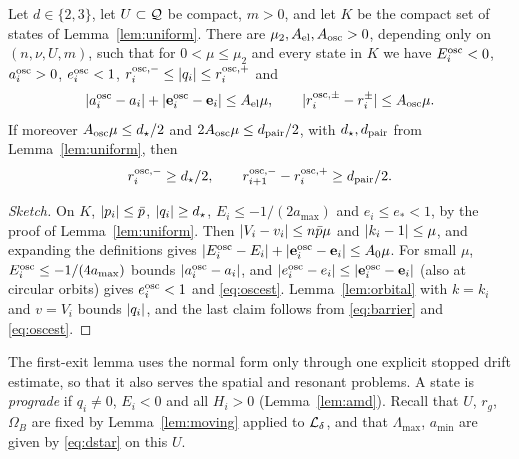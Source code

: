 \begin{lemma}
\label{lem:osc}
Let $d\in\{2,3\}$, let $U\subset\mathcal{Q}$ be compact, $m>0$, and let $K$ be the compact set of states of Lemma~\ref{lem:uniform}. There are $\mu_2,A_{\mathrm{el}},A_{\mathrm{osc}}>0$, depending only on $(n,\nu,U,m)$, such that for $0<\mu\le\mu_2$ and every state in $K$ we have $E_i^{\mathrm{osc}}<0$, $a_i^{\mathrm{osc}}>0$, $e_i^{\mathrm{osc}}<1$, $r_i^{\mathrm{osc},-}\le\lvert q_i\rvert\le r_i^{\mathrm{osc},+}$ and
\begin{equation}
\label{eq:oscest}
\lvert a_i^{\mathrm{osc}}-a_i\rvert+\lvert \mathbf{e}_i^{\mathrm{osc}}-\mathbf{e}_i\rvert\le A_{\mathrm{el}}\mu,\qquad \lvert r_i^{\mathrm{osc},\pm}-r_i^\pm\rvert\le A_{\mathrm{osc}}\mu.
\end{equation}
If moreover $A_{\mathrm{osc}}\mu\le d_\star/2$ and $2A_{\mathrm{osc}}\mu\le d_{\mathrm{pair}}/2$, with $d_\star,d_{\mathrm{pair}}$ from Lemma~\ref{lem:uniform}, then
\[
r_i^{\mathrm{osc},-}\ge d_\star/2,\qquad r_{i+1}^{\mathrm{osc},-}-r_i^{\mathrm{osc},+}\ge d_{\mathrm{pair}}/2.
\]
\end{lemma}

\begin{proof}[Sketch]
On $K$, $\lvert p_i\rvert\le\bar p$, $\lvert q_i\rvert\ge d_\star$, $E_i\le-1/(2a_{\max})$ and $e_i\le e_*<1$, by the proof of Lemma~\ref{lem:uniform}. Then $\lvert V_i-v_i\rvert\le n\bar p\mu$ and $\lvert k_i-1\rvert\le\mu$, and expanding the definitions gives $\lvert E_i^{\mathrm{osc}}-E_i\rvert+\lvert \mathbf{e}_i^{\mathrm{osc}}-\mathbf{e}_i\rvert\le A_0\mu$. For small $\mu$, $E_i^{\mathrm{osc}}\le-1/(4a_{\max})$ bounds $\lvert a_i^{\mathrm{osc}}-a_i\rvert$, and $\lvert e_i^{\mathrm{osc}}-e_i\rvert\le\lvert \mathbf{e}_i^{\mathrm{osc}}-\mathbf{e}_i\rvert$ (also at circular orbits) gives $e_i^{\mathrm{osc}}<1$ and \eqref{eq:oscest}. Lemma~\ref{lem:orbital} with $k=k_i$ and $v=V_i$ bounds $\lvert q_i\rvert$, and the last claim follows from \eqref{eq:barrier} and \eqref{eq:oscest}.
\end{proof}

The first-exit lemma uses the normal form only through one explicit stopped drift estimate, so that it also serves the spatial and resonant problems. A state is \emph{prograde} if $q_i\ne0$, $E_i<0$ and all $H_i>0$ (Lemma~\ref{lem:amd}). Recall that $U$, $r_g$, $\Omega_B$ are fixed by Lemma~\ref{lem:moving} applied to $\mathcal{L}_\delta$, and that $\Lambda_{\max}$, $a_{\min}$ are given by \eqref{eq:dstar} on this $U$.

